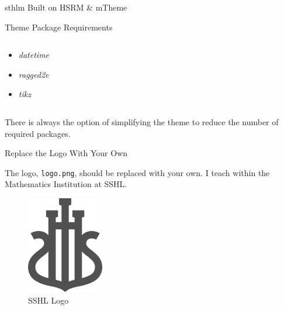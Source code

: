 \documentclass[newPxFont]{beamer}
\begin{document}
\begin{frame}[c]{sthlm Built on HSRM \& mTheme}
\begin{frame}{Theme Package Requirements}
\begin{columns}[t]
\begin{column}{0.5\textwidth}
\begin{itemize}
\item \emph{datetime}
\item \emph{ragged2e}
\item \emph{tikz}
\end{itemize}
\end{column}
\end{columns}
\vspace{1cm}
There is always the option of simplifying the theme to reduce the number of required packages. 

\end{frame}


\begin{frame}{Replace the Logo With Your Own}

The  logo, \texttt{logo.png}, should be replaced with your own.  I teach within the Mathematics Institution at SSHL.
\vspace{1cm}
\begin{figure}
	\centerline{\includegraphics[width=0.3\textwidth]{logo.png}}
\caption{SSHL Logo}
\end{figure}

\end{frame}



\end{frame}
\end{document}
